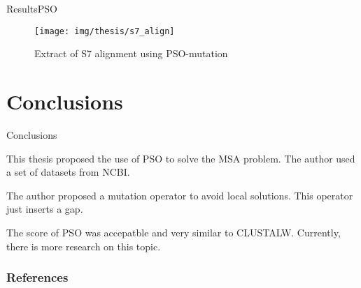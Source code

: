 \documentclass[10pt]{beamer}
\newcommand{\1}{
        	\setbeamertemplate{background}{
        		\texttt{[image: img/1]}
        		\tikz[overlay] \fill[fill opacity=0.75,fill=white] (0,0) rectangle (-\paperwidth,\paperheight);
        	}
}
\begin{document}
\begin{frame}{Results}{PSO}
	\begin{figure}[h]
		\centering		
			\texttt{[image: img/thesis/s7\_align]}	
		\caption{Extract of S7 alignment using PSO-mutation}
	\end{figure}
\end{frame}

\section{Conclusions}

\begin{frame}{Conclusions}{}
	\begin{block}{}
		This thesis proposed the use of PSO to solve the MSA problem. The author used a set of datasets from NCBI.
	\end{block}

	\begin{block}{}
		The author proposed a mutation operator to avoid local solutions. This operator just inserts a gap.
	\end{block}

	\begin{block}{}
		The score of PSO was accepatble and very similar to CLUSTALW. Currently, there is more research on this topic.
	\end{block}
\end{frame}

\begin{frame}[allowframebreaks]
	\frametitle{References}
	
	
\end{frame}
\end{document}
